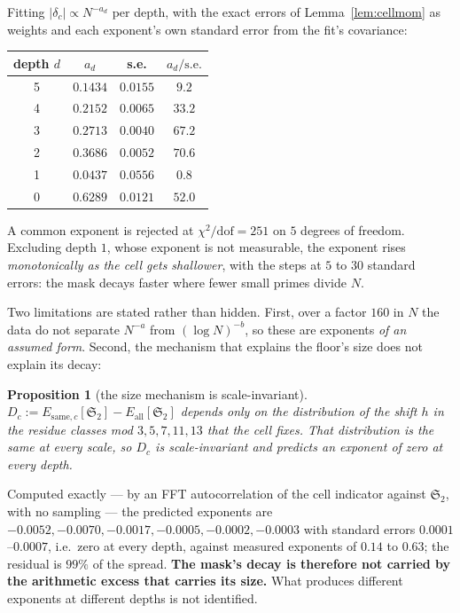 \documentclass[11pt,a4paper]{article}
\theoremstyle{plain}
\newtheorem{proposition}[theorem]{Proposition}
\theoremstyle{definition}
\renewcommand{\SS}{\mathfrak{S}}
\begin{document}
Fitting $|\delta_c| \propto N^{-a_d}$ per depth, with the exact errors
of Lemma~\ref{lem:cellmom} as weights and each exponent's own standard
error from the fit's covariance:

\begin{center}
\begin{tabular}{cccc}
\hline
depth $d$ & $a_d$ & s.e. & $a_d/\mathrm{s.e.}$\\
\hline
5 & $0.1434$ & $0.0155$ & $9.2$\\
4 & $0.2152$ & $0.0065$ & $33.2$\\
3 & $0.2713$ & $0.0040$ & $67.2$\\
2 & $0.3686$ & $0.0052$ & $70.6$\\
1 & $0.0437$ & $0.0556$ & $0.8$\\
0 & $0.6289$ & $0.0121$ & $52.0$\\
\hline
\end{tabular}
\end{center}

A common exponent is rejected at $\chi^2/\mathrm{dof} = 251$ on
$5$ degrees of freedom. Excluding depth $1$, whose exponent is not
measurable, the exponent rises \emph{monotonically as the cell gets
shallower}, with the steps at $5$ to $30$ standard errors: the mask
decays faster where fewer small primes divide $N$.

Two limitations are stated rather than hidden. First, over a factor
$160$ in $N$ the data do not separate $N^{-a}$ from $(\log N)^{-b}$, so
these are exponents \emph{of an assumed form}. Second, the mechanism
that explains the floor's size does not explain its decay:

\begin{proposition}[the size mechanism is scale-invariant]
\label{prop:scaleinv}
$D_c := E_{\mathrm{same},c}[\SS_2] - E_{\mathrm{all}}[\SS_2]$ depends
only on the distribution of the shift $h$ in the residue classes mod
$3,5,7,11,13$ that the cell fixes. That distribution is the same at
every scale, so $D_c$ is scale-invariant and predicts an exponent of
zero at every depth.
\end{proposition}

Computed exactly --- by an FFT autocorrelation of the cell indicator
against $\SS_2$, with no sampling --- the predicted exponents are
$-0.0052, -0.0070, -0.0017, -0.0005, -0.0002, -0.0003$ with standard
errors $0.0001$--$0.0007$, i.e.\ zero at every depth, against measured
exponents of $0.14$ to $0.63$; the residual is $99\%$ of the spread.
\textbf{The mask's decay is therefore not carried by the arithmetic
excess that carries its size.} What produces different exponents at
different depths is not identified.
\end{document}
